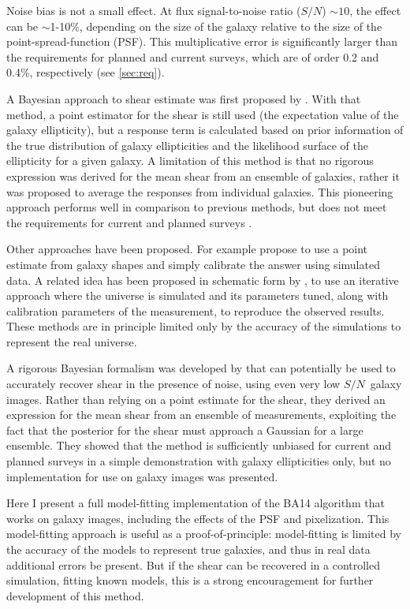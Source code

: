 \documentclass[12pt,preprint]{aastex}
\newcommand{\sn}{$S/N$}
\begin{document}
Noise bias is not a small effect.  At flux signal-to-noise ratio (\sn) $\sim
10$, the effect can be $\sim$1-10\%, depending on the size of the galaxy
relative to the size of the point-spread-function (PSF).  This multiplicative
error is significantly larger than the requirements for planned and current
surveys, which are of order 0.2 and 0.4\%, respectively (see \ref{sec:req}).

A Bayesian approach to shear estimate was first proposed by \cite{Miller07}.
With that method, a point estimator for the shear is still used (the
expectation value of the galaxy ellipticity), but a response term is calculated
based on prior information of the true distribution of galaxy ellipticities and
the likelihood surface of the ellipticity for a given galaxy.  A limitation of
this method is that no rigorous expression was derived for the mean shear from
an ensemble of galaxies, rather it was proposed to average the responses from
individual galaxies.  This pioneering approach performs well in comparison to
previous methods, but does not meet the requirements for current and planned
surveys \citep{ba14}.

Other approaches have been proposed. For example \cite{Zuntz13} propose to use
a point estimate from galaxy shapes and simply calibrate the answer using
simulated data.  A related idea has been proposed in schematic form by
\cite{Refregier13}, to use an iterative approach where the universe is
simulated and its parameters tuned, along with calibration parameters of the
measurement, to reproduce the observed results.  These methods are in principle
limited only by the accuracy of the simulations to represent the real universe.

A rigorous Bayesian formalism was developed by \cite[][herafter BA14]{ba14}
that can potentially be used to accurately recover shear in the presence of
noise, using even very low \sn\ galaxy images.  Rather than relying on a point
estimate for the shear, they derived an expression for the mean shear from an
ensemble of measurements, exploiting the fact that the posterior for the shear
must approach a Gaussian for a large ensemble.  They showed that the method is
sufficiently unbiased for current and planned surveys in a simple demonstration
with galaxy ellipticities only, but no implementation for use on galaxy images
was presented.

Here I present a full model-fitting implementation of the BA14 algorithm that
works on galaxy images, including the effects of the PSF and pixelization.
This model-fitting approach is useful as a proof-of-principle:  model-fitting
is limited by the accuracy of the models to represent true galaxies, and thus
in real data additional errors be present.  But if the shear can be recovered
in a controlled simulation, fitting known models, this is a strong
encouragement for further development of this method.
\end{document}
